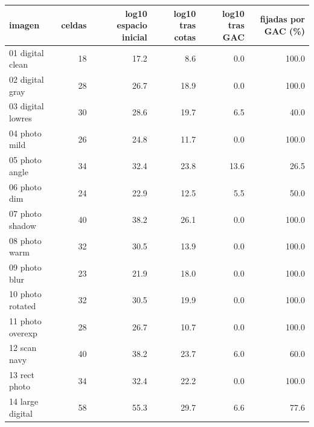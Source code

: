 \begin{tabular}{lrrrrr}
\toprule
imagen & celdas & log10 espacio inicial & log10 tras cotas & log10 tras GAC & fijadas por GAC (\%) \\
\midrule
01 digital clean & 18 & 17.2 & 8.6 & 0.0 & 100.0 \\
02 digital gray & 28 & 26.7 & 18.9 & 0.0 & 100.0 \\
03 digital lowres & 30 & 28.6 & 19.7 & 6.5 & 40.0 \\
04 photo mild & 26 & 24.8 & 11.7 & 0.0 & 100.0 \\
05 photo angle & 34 & 32.4 & 23.8 & 13.6 & 26.5 \\
06 photo dim & 24 & 22.9 & 12.5 & 5.5 & 50.0 \\
07 photo shadow & 40 & 38.2 & 26.1 & 0.0 & 100.0 \\
08 photo warm & 32 & 30.5 & 13.9 & 0.0 & 100.0 \\
09 photo blur & 23 & 21.9 & 18.0 & 0.0 & 100.0 \\
10 photo rotated & 32 & 30.5 & 19.9 & 0.0 & 100.0 \\
11 photo overexp & 28 & 26.7 & 10.7 & 0.0 & 100.0 \\
12 scan navy & 40 & 38.2 & 23.7 & 6.0 & 60.0 \\
13 rect photo & 34 & 32.4 & 22.2 & 0.0 & 100.0 \\
14 large digital & 58 & 55.3 & 29.7 & 6.6 & 77.6 \\
\bottomrule
\end{tabular}
